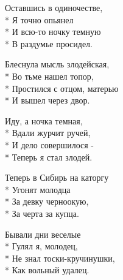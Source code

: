 \medskip

\begin{minipage}{\linewidth}
Оставшись в одиночестве,\\*
Я точно опьянел\\*
И всю-то ночку темную\\*
В раздумье просидел.\\
\end{minipage}\par\medskip\nobreak

\medskip

\begin{minipage}{\linewidth}
Блеснула мысль злодейская,\\*
Во тьме нашел топор,\\*
Простился с отцом, матерью\\*
И вышел через двор.\\
\end{minipage}\par\medskip\nobreak

\medskip

\begin{minipage}{\linewidth}
Иду, а ночка темная,\\*
Вдали журчит ручей,\\*
И дело совершилося -\\*
Теперь я стал злодей.\\
\end{minipage}\par\medskip\nobreak

\medskip

\begin{minipage}{\linewidth}
Теперь в Сибирь на каторгу\\*
Угонят молодца\\*
За девку черноокую,\\*
За черта за купца.\\
\end{minipage}\par\medskip\nobreak

\medskip

\begin{minipage}{\linewidth}
Бывали дни веселые\\*
Гулял я, молодец,\\*
Не знал тоски-кручинушки,\\*
Как вольный удалец.\\
\end{minipage}

\vspace{\fill}\newpage


